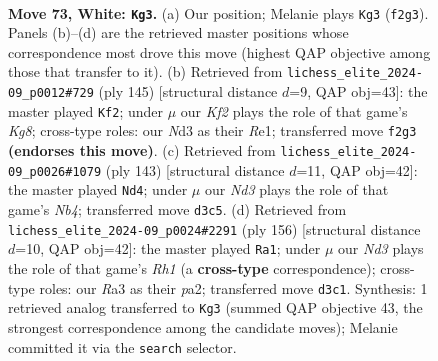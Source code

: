 \documentclass[11pt]{article}
\begin{document}
\clearpage

\begin{figure}[p]\centering
\begin{subfigure}{0.46\textwidth}\centering
\resizebox{\linewidth}{!}{%
\newchessgame
\chessboard[
  setfen={8/8/1k6/8/8/R2N4/5KPr/8 w - - 10 73},
  showmover=false,
  pgfstyle=straightmove, color=movearrow, markmove={f2-g3}
]}
\caption{}
\end{subfigure}\hfill
\begin{subfigure}{0.46\textwidth}\centering
\resizebox{\linewidth}{!}{%
\newchessgame
\chessboard[
  setfen={8/8/8/2K5/8/6R1/6p1/4r1k1 b - - 1 73},
  showmover=false,
  pgfstyle=straightmove, color=movearrow, markmove={g1-f2}
]}
\caption{}
\end{subfigure}
\\[4pt]
\begin{subfigure}{0.46\textwidth}\centering
\resizebox{\linewidth}{!}{%
\newchessgame
\chessboard[
  setfen={8/8/2R5/1np1K3/2k5/8/8/8 b - - 1 72},
  showmover=false,
  pgfstyle=straightmove, color=movearrow, markmove={b5-d4}
]}
\caption{}
\end{subfigure}\hfill
\begin{subfigure}{0.46\textwidth}\centering
\resizebox{\linewidth}{!}{%
\newchessgame
\chessboard[
  setfen={7r/7P/7K/8/1k6/8/p7/7R w - - 8 79},
  showmover=false,
  pgfstyle=straightmove, color=movearrow, markmove={h1-a1}
]}
\caption{}
\end{subfigure}
\caption{\textbf{Move 73, White: \texttt{Kg3}.} (a) Our position; Melanie plays \texttt{Kg3} (\texttt{f2g3}). Panels (b)--(d) are the retrieved master positions whose correspondence most drove this move (highest QAP objective among those that transfer to it). (b) Retrieved from \texttt{lichess\_elite\_2024-09\_p0012\#729} (ply 145) [structural distance $d$=9, QAP obj=43]: the master played \texttt{Kf2}; under $\mu$ our \emph{Kf2} plays the role of that game's \emph{Kg8}; cross-type roles: our \emph{N}d3 as their \emph{R}e1; transferred move \texttt{f2g3} \textbf{(endorses this move)}. (c) Retrieved from \texttt{lichess\_elite\_2024-09\_p0026\#1079} (ply 143) [structural distance $d$=11, QAP obj=42]: the master played \texttt{Nd4}; under $\mu$ our \emph{Nd3} plays the role of that game's \emph{Nb4}; transferred move \texttt{d3c5}. (d) Retrieved from \texttt{lichess\_elite\_2024-09\_p0024\#2291} (ply 156) [structural distance $d$=10, QAP obj=42]: the master played \texttt{Ra1}; under $\mu$ our \emph{Nd3} plays the role of that game's \emph{Rh1} (a \textbf{cross-type} correspondence); cross-type roles: our \emph{R}a3 as their \emph{p}a2; transferred move \texttt{d3c1}. Synthesis: 1 retrieved analog transferred to \texttt{Kg3} (summed QAP objective 43, the strongest correspondence among the candidate moves); Melanie committed it via the \texttt{search} selector.}
\label{fig:thought-m144}
\end{figure}
\end{document}
